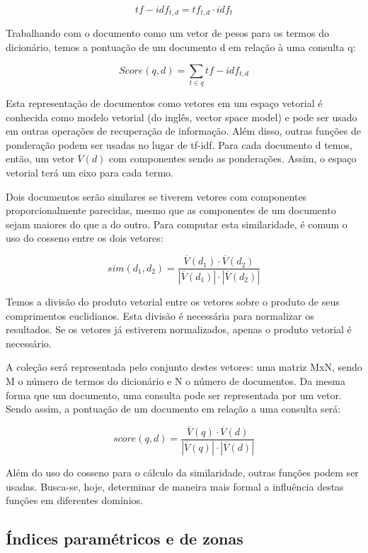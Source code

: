 $$tf-idf_{t,d} = tf_{t,d} \cdot idf_{t}$$

Trabalhando com o documento como um vetor de pesos para os termos do dicionário, temos a pontuação de um documento d em relação à uma consulta q:

\begin{displaymath}
Score(q,d) = \sum_{t \in q} tf-idf_{t,d}
\end{displaymath}

Esta representação de documentos como vetores em um espaço vetorial é conhecida como modelo vetorial (do inglês, vector space model) e pode ser usado em outras operações de recuperação de informação. Além disso, outras funções de ponderação podem ser usadas no lugar de tf-idf. Para cada documento d temos, então, um vetor $\overline{V}(d)$ com componentes sendo as ponderações. Assim, o espaço vetorial terá um eixo para cada termo.

Dois documentos serão similares se tiverem vetores com componentes proporcionalmente parecidas, mesmo que as componentes de um documento sejam maiores do que a do outro. Para computar esta similaridade, é comum o uso do cosseno entre os dois vetores:

$$sim(d_{1},d_{2}) = \frac{\overline{V}(d_{1})\cdot \overline{V}(d_{2})}{|\overline{V}(d_{1})|\cdot|\overline{V}(d_{2})|}$$

Temos a divisão do produto vetorial entre os vetores sobre o produto de seus comprimentos euclidianos. Esta divisão é necessária para normalizar os resultados. Se os vetores já estiverem normalizados, apenas o produto vetorial é necessário.

A coleção será representada pelo conjunto destes vetores: uma matriz MxN, sendo M o número de termos do dicionário e N o número de documentos. Da mesma forma que um documento, uma consulta pode ser representada por um vetor. Sendo assim, a pontuação de um documento em relação a uma consulta será:

$$score(q,d) = \frac{\overline{V}(q) \cdot \overline{V}(d)}{|\overline{V}(q)|\cdot|\overline{V}(d)|}$$

Além do uso do cosseno para o cálculo da similaridade, outras funções podem ser usadas. Busca-se, hoje, determinar de maneira mais formal a influência destas funções em diferentes domínios.

\subsection{Índices paramétricos e de zonas}

